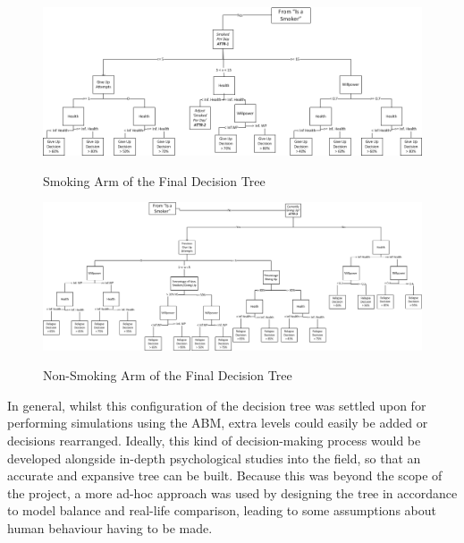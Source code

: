 \documentclass[]{report}
\begin{document}
\begin{landscape}
\begin{figure}
\begin{center}
\includegraphics[width=\paperwidth,keepaspectratio]{Dectree-left.png}
\label{img:dectree-left}
\caption{Smoking Arm of the Final Decision Tree}
\end{center}
\end{figure}
\end{landscape}

\begin{landscape}
\begin{figure}
\begin{center}
\includegraphics[width=\paperwidth,keepaspectratio]{dectree-right.png}
\label{img:dectree-right}
\caption{Non-Smoking Arm of the Final Decision Tree}
\end{center}
\end{figure}
\end{landscape}

In general, whilst this configuration of the decision tree was settled upon for performing simulations using the ABM, extra levels could easily be added or decisions rearranged. Ideally, this kind of decision-making process would be developed alongside in-depth psychological studies into the field, so that an accurate and expansive tree can be built. Because this was beyond the scope of the project, a more ad-hoc approach was used by designing the tree in accordance to model balance and real-life comparison, leading to some assumptions about human behaviour having to be made.
\end{document}
